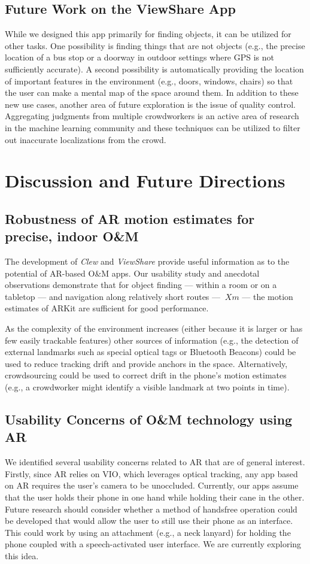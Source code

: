 \documentclass[chi_draft]{sigchi}
\newcommand{\OM}{O\&M\xspace}
\begin{document}
\subsection{Future Work on the ViewShare App}
While we designed this app primarily for finding objects, it can be utilized for other tasks.  One possibility is finding things that are not objects (e.g., the precise location of a bus stop or a doorway in outdoor settings where GPS is not sufficiently accurate).  A second possibility is automatically providing the location of important features in the environment (e.g., doors, windows, chairs) so that the user can make a mental map of the space around them.  In addition to these new use cases, another area of future exploration is the issue of quality control.  Aggregating judgments from multiple crowdworkers is an active area of research in the machine learning community and these techniques can be utilized to filter out inaccurate localizations from the crowd.

\section{Discussion and Future Directions}


\subsection{Robustness of AR motion estimates for precise, indoor \OM} The development of \emph{Clew} and \emph{ViewShare} provide useful information as to the potential of AR-based \OM apps.  Our usability study and anecdotal observations demonstrate that for object finding --- within a room or on a tabletop --- and navigation along relatively short routes --- $~Xm$ --- the motion estimates of ARKit are sufficient for good performance.  

As the complexity of the environment increases (either because it is larger or has few easily trackable features) other sources of information (e.g., the detection of external landmarks such as special optical tags or Bluetooth Beacons) could be used to reduce tracking drift and provide anchors in the space.  Alternatively, crowdsourcing could be used to correct drift in the phone's motion estimates (e.g., a crowdworker might identify a visible landmark at two points in time).

\subsection{Usability Concerns of \OM technology using AR}
We identified several usability concerns related to AR that are of general interest.  Firstly, since AR relies on VIO, which leverages optical tracking, any app based on AR requires the user's camera to be unoccluded.  Currently, our apps assume that the user holds their phone in one hand while holding their cane in the other.  Future research should consider whether a method of handsfree operation could be developed that would allow the user to still use their phone as an interface.  This could work by using an attachment (e.g., a neck lanyard) for holding the phone coupled with a speech-activated user interface.  We are currently exploring this idea.
\end{document}

